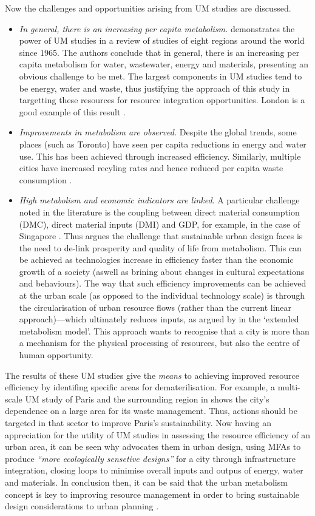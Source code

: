 Now the challenges and opportunities arising from UM studies are discussed.
\begin{itemize}
	\item \emph{In general, there is an increasing per capita metabolism.} \citet{Kennedy2008} demonstrates the power of UM studies in a review of studies of eight regions around the world since 1965. The authors conclude that in general, there is an increasing per capita metabolism for water, wastewater, energy and materials, presenting an obvious challenge to be met. The largest components in UM studies tend to be energy, water and waste, thus justifying the approach of this study in targetting these resources for resource integration opportunities. London is a good example of this result \citep{BFF2002}.
	\item \emph{Improvements in metabolism are observed.} Despite the global trends, some places (such as Toronto) have seen per capita reductions in energy and water use. This has been achieved through increased efficiency. Similarly, multiple cities have increased recyling rates and hence reduced per capita waste consumption \citep{Kennedy2008}. 
	\item \emph{High metabolism and economic indicators are linked}. A particular challenge noted in the literature is the coupling between direct material consumption (DMC), direct material inputs (DMI) and GDP, for example, in the case of Singapore \citep{Schulz2007a}. Thus \citet{Kowalski1997} argues the challenge that sustainable urban design faces is the need to de-link prosperity and quality of life from metabolism. This can be achieved as technologies increase in efficiency faster than the economic growth of a society (aswell as brining about changes in cultural expectations and behaviours). The way that such efficiency improvements can be achieved at the urban scale (as opposed to the individual technology scale) is through the circularisation of urban resource flows (rather than the current linear approach)---which ultimately reduces inputs, as argued by \citet{Newman1999} in the `extended metabolism model'. This approach wants to recognise that a city is more than a mechanism for the physical processing of resources, but also the centre of human opportunity. 
\end{itemize} 
The results of these UM studies give the \emph{means} to achieving improved resource efficiency by identifing specific areas for dematerilisation. For example, a multi-scale UM study of Paris and the surrounding region in \citet{Barles2009} shows the city's dependence on a large area for its waste management. Thus, actions should be targeted in that sector to improve Paris's sustainability. Now having an appreciation for the utility of UM studies in assessing the resource efficiency of an urban area, it can be seen why \citet{Kennedy2011} advocates them in urban design, using MFAs to produce \emph{``more ecologically sensetive designs''} for a city through infrastructure integration, closing loops to minimise overall inputs and outpus of energy, water and materials. In conclusion then, it can be said that the urban metabolism concept is key to improving resource management in order to bring sustainable design considerations to urban planning \citep{Agudelo-Vera2011}.
